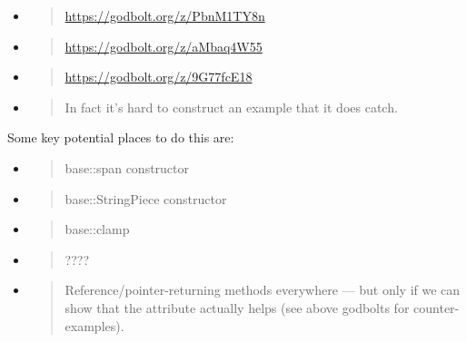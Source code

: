 \documentclass[a4paper,12pt,notitlepage,twoside,openright]{article}
\begin{document}
\begin{itemize}
\item
  \begin{quote}
  \href{https://www.google.com/url?q=https://godbolt.org/z/PbnM1TY8n\&sa=D\&source=editors\&ust=1631944129038000\&usg=AOvVaw2rfmJ9A2vbf5NxysSnFJQD}{https://godbolt.org/z/PbnM1TY8n}
  \end{quote}
\item
  \begin{quote}
  \href{https://www.google.com/url?q=https://godbolt.org/z/aMbaq4W55\&sa=D\&source=editors\&ust=1631944129039000\&usg=AOvVaw2QHvbnCGBCtLIR1zR43GFJ}{https://godbolt.org/z/aMbaq4W55}
  \end{quote}
\item
  \begin{quote}
  \href{https://www.google.com/url?q=https://godbolt.org/z/9G77fcE18\&sa=D\&source=editors\&ust=1631944129039000\&usg=AOvVaw298-Iy0OCDeOVx7H82I5J0}{https://godbolt.org/z/9G77fcE18}
  \end{quote}
\end{itemize}

\begin{itemize}
\item
  \begin{quote}
  In fact it's hard to construct an example that it does catch.
  \end{quote}
\end{itemize}

Some key potential places to do this are:

\begin{itemize}
\item
  \begin{quote}
  base::span constructor
  \end{quote}
\item
  \begin{quote}
  base::StringPiece constructor
  \end{quote}
\item
  \begin{quote}
  base::clamp
  \end{quote}
\item
  \begin{quote}
  ????
  \end{quote}
\item
  \begin{quote}
  Reference/pointer-returning methods everywhere --- but only if we can
  show that the attribute actually helps (see above godbolts for
  counter-examples).
  \end{quote}
\end{itemize}
\end{document}
